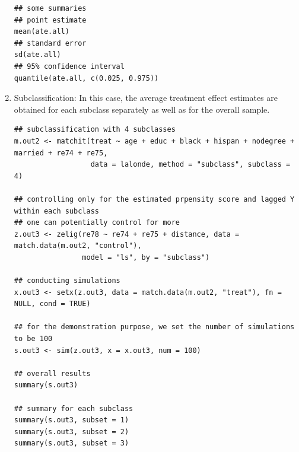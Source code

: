 \documentclass[oneside,letterpaper,titlepage]{article}
\begin{document}
\begin{enumerate}
\begin{verbatim}
## some summaries
## point estimate
mean(ate.all)
## standard error
sd(ate.all)
## 95% confidence interval
quantile(ate.all, c(0.025, 0.975))
\end{verbatim}
  
\item Subclassification: In this case, the average treatment effect
  estimates are obtained for each subclass separately as well as
  for the overall sample.

\begin{verbatim}
## subclassification with 4 subclasses
m.out2 <- matchit(treat ~ age + educ + black + hispan + nodegree + married + re74 + re75,  
                  data = lalonde, method = "subclass", subclass = 4)

## controlling only for the estimated prpensity score and lagged Y within each subclass
## one can potentially control for more
z.out3 <- zelig(re78 ~ re74 + re75 + distance, data = match.data(m.out2, "control"), 
                model = "ls", by = "subclass")

## conducting simulations
x.out3 <- setx(z.out3, data = match.data(m.out2, "treat"), fn = NULL, cond = TRUE)

## for the demonstration purpose, we set the number of simulations to be 100
s.out3 <- sim(z.out3, x = x.out3, num = 100)

## overall results
summary(s.out3) 

## summary for each subclass
summary(s.out3, subset = 1) 
summary(s.out3, subset = 2) 
summary(s.out3, subset = 3) 
\end{verbatim}
  
%
\end{enumerate}
\end{document}
